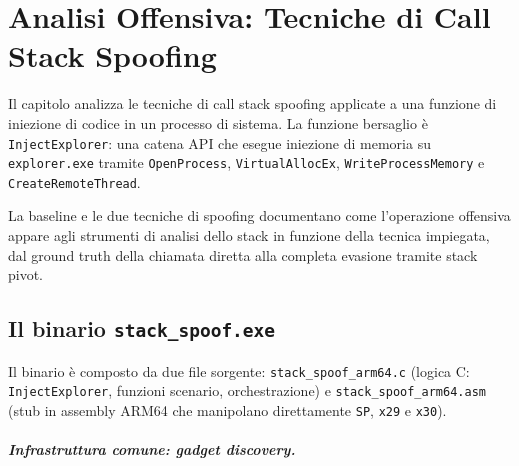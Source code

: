 \chapter{Analisi Offensiva: Tecniche di Call Stack Spoofing}
\label{ch:scenari}

Il capitolo analizza le tecniche di call stack spoofing applicate a una
funzione di iniezione di codice in un processo di sistema. La funzione bersaglio
è \texttt{InjectExplorer}: una catena API che esegue iniezione di memoria su
\texttt{explorer.exe} tramite \texttt{OpenProcess}, \texttt{VirtualAllocEx},
\texttt{WriteProcessMemory} e \texttt{CreateRemoteThread}.

La baseline e le due tecniche di spoofing documentano come
l'operazione offensiva appare agli strumenti di analisi dello stack in funzione
della tecnica impiegata, dal ground truth della chiamata diretta alla completa
evasione tramite stack pivot.


\section*{Il binario \texttt{stack\_spoof.exe}}

Il binario è composto da due file sorgente: \texttt{stack\_spoof\_arm64.c}
(logica C: \texttt{InjectExplorer}, funzioni scenario, orchestrazione) e
\texttt{stack\_spoof\_arm64.asm} (stub in assembly ARM64 che manipolano
direttamente \texttt{SP}, \texttt{x29} e \texttt{x30}).

\paragraph{Infrastruttura comune: gadget discovery.}\leavevmode

